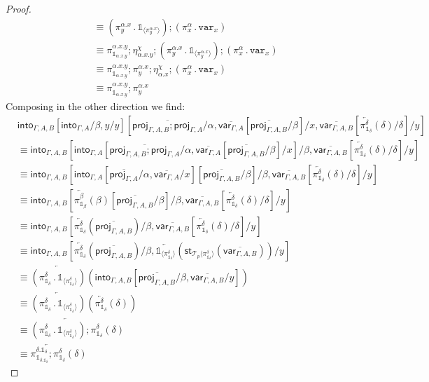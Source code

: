 \documentclass[10pt]{article}
\theoremstyle{definition}
\newcommand{\rewrite}[2]{\overleftarrow{#1}(#2)}
\newcommand\StI[2]{\ensuremath{\mathsf{st}_{#1}(#2)}}
\newcommand\ApEl[2]{\mathcal{T}_{#1}\langle#2\rangle}
\newcommand\bdot[0]{\mathbin{.}}
\newcommand{\upstairs}[1]{\overline{#1}}
\newcommand\proj[1]{\ensuremath{\mathsf{proj}_{#1}}}
\newcommand\qvar[1]{\ensuremath{\mathsf{var}_{#1}}}
\newcommand\into[1]{\ensuremath{\mathsf{into}_{#1}}}
\newcommand\One{\ensuremath{\mathds{1}}}
\newcommand\var[1]{\ensuremath{\mathtt{var}_{#1}}}
\newcommand\ApOne[1]{\ensuremath{\One_{\langle {#1} \rangle }}}
\begin{document}
\begin{proof}
\begin{align*}
&\equiv (\pi^{\alpha.x}_y \bdot \ApOne{\pi^{\alpha.x}_y});(\pi^\alpha_x \bdot \var{x}) \\
&\equiv \pi^{\alpha.x.y}_{\One_{\alpha.x.y}};\eta^\chi_{\alpha.x.y};(\pi^{\alpha.x}_y \bdot \ApOne{\pi^{\alpha.x}_y});(\pi^\alpha_x \bdot \var{x}) \\
&\equiv \pi^{\alpha.x.y}_{\One_{\alpha.x.y}};\pi^{\alpha.x}_y;\eta^\chi_{\alpha.x};(\pi^\alpha_x \bdot \var{x}) \\
&\equiv \pi^{\alpha.x.y}_{\One_{\alpha.x.y}};\pi^{\alpha.x}_y
\end{align*}
Composing in the other direction we find:
\begin{align*}
&\into{\Gamma, A, B}[\into{\Gamma, A}/\beta, y/y][\upstairs{\proj{\Gamma, A, B};\proj{\Gamma, A}}/\alpha, \upstairs{\qvar{\Gamma, A}}[\upstairs{\proj{\Gamma, A, B}}/\beta]/x, \upstairs{\qvar{\Gamma, A, B}}[\rewrite{\pi^\delta_{\One_\delta}}{\delta}/\delta]/y] \\
&\equiv \into{\Gamma, A, B}[\into{\Gamma, A}[\upstairs{\proj{\Gamma, A, B};\proj{\Gamma, A}}/\alpha, \upstairs{\qvar{\Gamma, A}}[\upstairs{\proj{\Gamma, A, B}}/\beta]/x] /\beta, \upstairs{\qvar{\Gamma, A, B}}[\rewrite{\pi^\delta_{\One_\delta}}{\delta}/\delta]/y] \\
&\equiv \into{\Gamma, A, B}[\into{\Gamma, A}[\upstairs{\proj{\Gamma, A}}/\alpha, \upstairs{\qvar{\Gamma, A}}/x][\upstairs{\proj{\Gamma, A, B}}/\beta]/\beta, \upstairs{\qvar{\Gamma, A, B}}[\rewrite{\pi^\delta_{\One_\delta}}{\delta}/\delta]/y] \\
&\equiv \into{\Gamma, A, B}[\rewrite{\pi^{\beta}_{\One_{\beta}}}{\beta}[\upstairs{\proj{\Gamma, A, B}}/\beta]/\beta, \upstairs{\qvar{\Gamma, A, B}}[\rewrite{\pi^\delta_{\One_\delta}}{\delta}/\delta]/y] \\
&\equiv \into{\Gamma, A, B}[\rewrite{\pi^{\delta}_{\One_{\delta}}}{\upstairs{\proj{\Gamma, A, B}}}/\beta, \upstairs{\qvar{\Gamma, A, B}}[\rewrite{\pi^\delta_{\One_\delta}}{\delta}/\delta]/y]\\
&\equiv \into{\Gamma, A, B}[\rewrite{\pi^{\delta}_{\One_{\delta}}}{\upstairs{\proj{\Gamma, A, B}}}/\beta, \rewrite{\ApOne{\pi^{\delta}_{\One_{\delta}}}}{\StI{\ApEl{p}{\pi^{\delta}_{\One_{\delta}}}}{\upstairs{\qvar{\Gamma, A, B}}}}/y]\\
&\equiv \rewrite{(\pi^{\delta}_{\One_{\delta}} \bdot \ApOne{\pi^{\delta}_{\One_{\delta}}})}{\into{\Gamma, A, B}[\upstairs{\proj{\Gamma, A, B}}/\beta, \upstairs{\qvar{\Gamma, A, B}}/y]}  \\
&\equiv \rewrite{(\pi^{\delta}_{\One_{\delta}} \bdot \ApOne{\pi^{\delta}_{\One_{\delta}}})}{\rewrite{\pi^{\delta}_{\One_{\delta}}}{\delta}}  \\
&\equiv \rewrite{(\pi^{\delta}_{\One_{\delta}} \bdot \ApOne{\pi^{\delta}_{\One_{\delta}}});\pi^{\delta}_{\One_{\delta}}}{\delta}  \\
&\equiv \rewrite{\pi^{\delta.\One_\delta}_{\One_{\delta.\One_\delta}};\pi^{\delta}_{\One_{\delta}}}{\delta}
\end{align*}
\end{proof}
\end{document}
